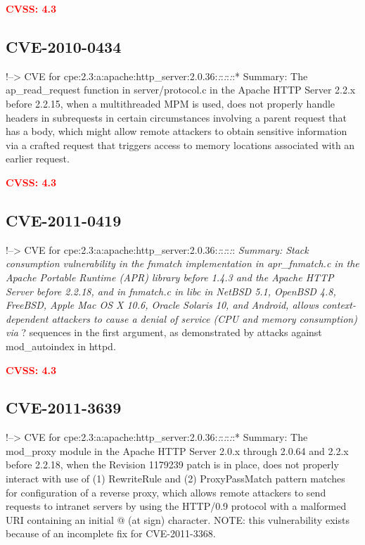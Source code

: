 \documentclass[a4paper, 12pt]{article}
\begin{document}
\textbf{\textcolor{red}{CVSS: 4.3}}

\hypertarget{cve-2010-0434}{%
\subsection{CVE-2010-0434}\label{cve-2010-0434}}

!--\textgreater{} CVE for
cpe:2.3:a:apache:http\_server:2.0.36:\emph{:}:\emph{:}:\emph{:}:*
Summary: The ap\_read\_request function in server/protocol.c in the
Apache HTTP Server 2.2.x before 2.2.15, when a multithreaded MPM is
used, does not properly handle headers in subrequests in certain
circumstances involving a parent request that has a body, which might
allow remote attackers to obtain sensitive information via a crafted
request that triggers access to memory locations associated with an
earlier request.

\textbf{\textcolor{red}{CVSS: 4.3}}

\hypertarget{cve-2011-0419}{%
\subsection{CVE-2011-0419}\label{cve-2011-0419}}

!--\textgreater{} CVE for
cpe:2.3:a:apache:http\_server:2.0.36:\emph{:}:\emph{:}:\emph{:}:\emph{
Summary: Stack consumption vulnerability in the fnmatch implementation
in apr\_fnmatch.c in the Apache Portable Runtime (APR) library before
1.4.3 and the Apache HTTP Server before 2.2.18, and in fnmatch.c in libc
in NetBSD 5.1, OpenBSD 4.8, FreeBSD, Apple Mac OS X 10.6, Oracle Solaris
10, and Android, allows context-dependent attackers to cause a denial of
service (CPU and memory consumption) via }? sequences in the first
argument, as demonstrated by attacks against mod\_autoindex in httpd.

\textbf{\textcolor{red}{CVSS: 4.3}}

\hypertarget{cve-2011-3639}{%
\subsection{CVE-2011-3639}\label{cve-2011-3639}}

!--\textgreater{} CVE for
cpe:2.3:a:apache:http\_server:2.0.36:\emph{:}:\emph{:}:\emph{:}:*
Summary: The mod\_proxy module in the Apache HTTP Server 2.0.x through
2.0.64 and 2.2.x before 2.2.18, when the Revision 1179239 patch is in
place, does not properly interact with use of (1) RewriteRule and (2)
ProxyPassMatch pattern matches for configuration of a reverse proxy,
which allows remote attackers to send requests to intranet servers by
using the HTTP/0.9 protocol with a malformed URI containing an initial @
(at sign) character. NOTE: this vulnerability exists because of an
incomplete fix for CVE-2011-3368.
\end{document}
